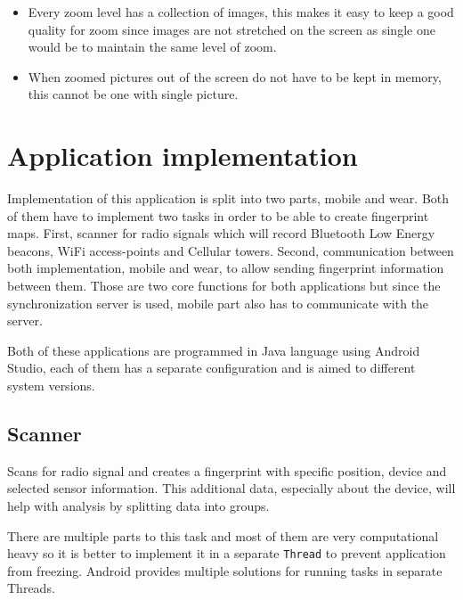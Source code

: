 \begin{itemize}
	\item Every zoom level has a collection of images, this makes it easy to keep a good quality for zoom since images are not stretched on the screen as single one would be to maintain the same level of zoom.
	\item When zoomed pictures out of the screen do not have to be kept in memory, this cannot be one with single picture.
\end{itemize}


\section{Application implementation}\label{sec:ApplicationImplementation}
Implementation of this application is split into two parts, mobile and wear. Both of them have to implement two tasks in order to be able to create fingerprint maps. First, scanner for radio signals which will record Bluetooth Low Energy beacons, WiFi access-points and Cellular towers. Second, communication between both implementation, mobile and wear, to allow sending fingerprint information between them. Those are two core functions for both applications but since the synchronization server is used, mobile part also has to communicate with the server.

Both of these applications are programmed in Java language using Android Studio, each of them has a separate configuration and is aimed to different system versions.

\subsection{Scanner}\label{subsec:Scanner}
Scans for radio signal and creates a fingerprint with specific position, device and selected sensor information. This additional data, especially about the device, will help with analysis by splitting data into groups.

There are multiple parts to this task and most of them are very computational heavy so it is better to implement it in a separate \verb|Thread| to prevent application from freezing. Android provides multiple solutions for running tasks in separate Threads.

